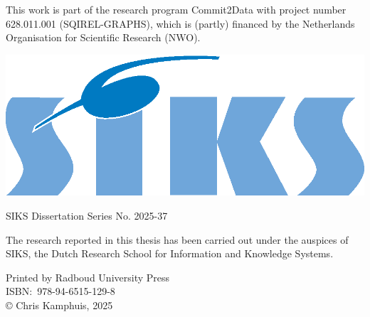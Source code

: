 \begin{titlepage}
	\begin{center}
		\vspace*{3.5cm}
		
		\huge{\bfseries\mytitle}
		
		\vspace*{15pt}
		
		\normalsize
		\myauthor
		
	\end{center}

\end{titlepage}
\newpage

\thispagestyle{empty}
\mbox{}
\vfill

\noindent%
\begin{minipage}[b][][b]{0.95\textwidth} %
	{
		\setlength{\parindent}{0cm}%
		This work is part of the research program Commit2Data with project number 628.011.001 (SQIREL-GRAPHS), which is (partly) financed by the Netherlands Organisation for Scientific Research (NWO).
	}
	
	\vspace{0.3cm}	
	
	{
		\includegraphics[scale=0.4]{imgs/siks.kleur.eps}
		\setlength{\parindent}{0cm}%
		
		SIKS Dissertation Series No. 2025-37
		
		\vspace{0.1cm}
		
		The research reported in this thesis has been carried out under the auspices of SIKS, the Dutch Research School for Information and Knowledge Systems.
	}
	
	\vspace{0.25cm}	
	
	{
		\setlength{\parindent}{0cm}%
		Printed by Radboud University Press\\[\baselineskip]
		ISBN:\ 978-94-6515-129-8\\[\baselineskip]
		\copyright{} Chris Kamphuis, 2025\\[\baselineskip]
	}
\end{minipage}%

